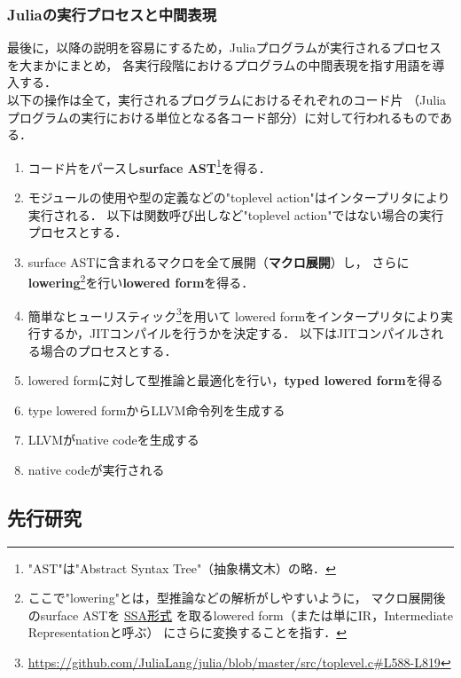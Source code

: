 \subsubsection{Juliaの実行プロセスと中間表現} \label{subsubsection:eval-process}

最後に，以降の説明を容易にするため，Juliaプログラムが実行されるプロセスを大まかにまとめ，
各実行段階におけるプログラムの中間表現を指す用語を導入する\cite{eval-of-julia-code, julia-asts}．\\

以下の操作は全て，実行されるプログラムにおけるそれぞれのコード片
（Juliaプログラムの実行における単位となる各コード部分）に対して行われるものである．

\begin{enumerate}
  \item コード片をパースし\textbf{surface AST}\footnote{
          "AST"は"Abstract Syntax Tree"（抽象構文木）の略．
        }を得る．
  \item モジュールの使用や型の定義などの"toplevel action"はインタープリタにより実行される．
        以下は関数呼び出しなど"toplevel action"ではない場合の実行プロセスとする．
  \item surface ASTに含まれるマクロを全て展開（\textbf{マクロ展開}）し，
        さらに\textbf{lowering}\footnote{
          ここで"lowering"とは，型推論などの解析がしやすいように，
          マクロ展開後のsurface ASTを
          \href{https://docs.julialang.org/en/latest/devdocs/ssair/}{SSA形式}
          を取るlowered form（または単にIR，Intermediate Representationと呼ぶ）
          にさらに変換することを指す．
        }を行い\textbf{lowered form}を得る．
  \item 簡単なヒューリスティック\footnote{
          \url{https://github.com/JuliaLang/julia/blob/master/src/toplevel.c\#L588-L819}
        }を用いて
        lowered formをインタープリタにより実行するか，JITコンパイルを行うかを決定する．
        以下はJITコンパイルされる場合のプロセスとする．
  \item lowered formに対して型推論と最適化を行い，\textbf{typed lowered form}を得る
  \item type lowered formからLLVM命令列を生成する
  \item LLVMがnative codeを生成する
  \item native codeが実行される
\end{enumerate}

\subsection{先行研究} \label{subsection:prev-reseaches}

